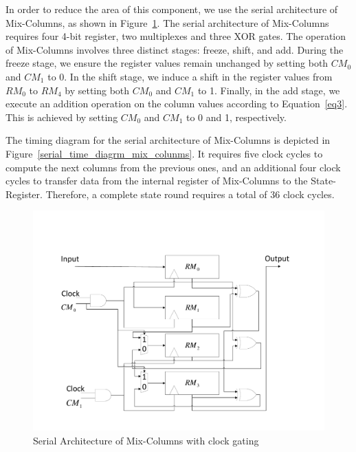 \documentclass[sn-basic]{sn-jnl}%
\begin{document}
In order to reduce the area of this component, we use the serial architecture of Mix-Columns, as shown in Figure~\ref{serial_mix_columns_fig}.
The serial architecture of Mix-Columns requires four 4-bit register, two multiplexes and three XOR gates.
The operation of Mix-Columns involves three distinct stages: freeze, shift, and add.
During the freeze stage, we ensure the register values remain unchanged by setting both $CM_0$ and $CM_1$ to 0.
In the shift stage, we induce a shift in the register values from $RM_0$ to $RM_4$ by setting both $CM_0$ and $CM_1$ to 1.
Finally, in the add stage, we execute an addition operation on the column values according to Equation~\ref{eq3}. This is achieved by setting $CM_0$ and $CM_1$ to 0 and 1, respectively.

The timing diagram for the serial architecture of Mix-Columns is depicted in Figure~\ref{serial_time_diagrm_mix_colunms}.
It requires five clock cycles to compute the next columns from the previous ones, and an additional four clock cycles to transfer data from the internal register of Mix-Columns to the State-Register.
Therefore, a complete state round requires a total of 36 clock cycles.


\begin{figure}[h]%
    \centering
    \includegraphics[width=\textwidth]{Mix-Columns.pdf}
    \caption{Serial Architecture of Mix-Columns with clock gating}\label{serial_mix_columns_fig}
\end{figure}
\end{document}
